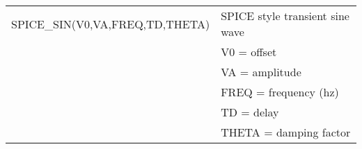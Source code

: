 {\begin{longtable}{>{\raggedright\small}m{2.5in}>{\raggedright\let\\\tabularnewline\small}m{2.5in}}
    SPICE\_SIN(V0,VA,FREQ,TD,THETA) & SPICE style transient sine wave \\
     & V0 = offset \\
     & VA = amplitude \\
     & FREQ = frequency (hz) \\
     & TD = delay \\
     & THETA = damping factor \\ \hline

  \end{longtable}
}
